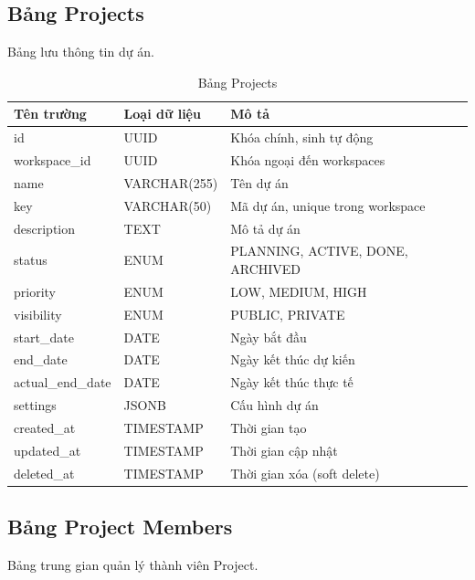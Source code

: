 \documentclass[12pt,a4paper]{report}
\begin{document}
\subsection{Bảng Projects}

Bảng lưu thông tin dự án.

\begin{table}[H]
\centering
\caption{Bảng Projects}
\begin{tabular}{|p{4cm}|p{4cm}|p{7cm}|}
\hline
\textbf{Tên trường} & \textbf{Loại dữ liệu} & \textbf{Mô tả} \\
\hline
id & UUID & Khóa chính, sinh tự động \\
\hline
workspace\_id & UUID & Khóa ngoại đến workspaces \\
\hline
name & VARCHAR(255) & Tên dự án \\
\hline
key & VARCHAR(50) & Mã dự án, unique trong workspace \\
\hline
description & TEXT & Mô tả dự án \\
\hline
status & ENUM & PLANNING, ACTIVE, DONE, ARCHIVED \\
\hline
priority & ENUM & LOW, MEDIUM, HIGH \\
\hline
visibility & ENUM & PUBLIC, PRIVATE \\
\hline
start\_date & DATE & Ngày bắt đầu \\
\hline
end\_date & DATE & Ngày kết thúc dự kiến \\
\hline
actual\_end\_date & DATE & Ngày kết thúc thực tế \\
\hline
settings & JSONB & Cấu hình dự án \\
\hline
created\_at & TIMESTAMP & Thời gian tạo \\
\hline
updated\_at & TIMESTAMP & Thời gian cập nhật \\
\hline
deleted\_at & TIMESTAMP & Thời gian xóa (soft delete) \\
\hline
\end{tabular}
\label{tab:projects_table}
\end{table}


\subsection{Bảng Project Members}

Bảng trung gian quản lý thành viên Project.
\end{document}
